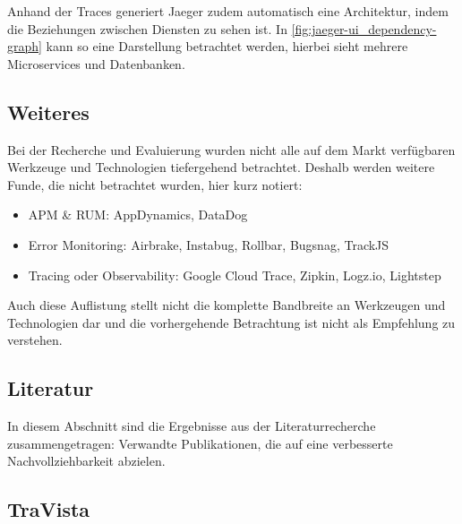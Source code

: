 Anhand der Traces generiert Jaeger zudem automatisch eine Architektur, indem die Beziehungen zwischen Diensten zu sehen ist. In \autoref{fig:jaeger-ui_dependency-graph} kann so eine Darstellung betrachtet werden, hierbei sieht mehrere Microservices und Datenbanken.

\subsection{Weiteres}
\label{sec:weitere-werkzeuge}

Bei der Recherche und Evaluierung wurden nicht alle auf dem Markt verfügbaren Werkzeuge und Technologien tiefergehend betrachtet. Deshalb werden weitere Funde, die nicht betrachtet wurden, hier kurz notiert:

\begin{itemize}
	\item APM \& RUM: AppDynamics, DataDog
	\item Error Monitoring: Airbrake, Instabug, Rollbar, Bugsnag, TrackJS
	\item Tracing oder Observability: Google Cloud Trace, Zipkin, Logz.io, Lightstep
\end{itemize}

Auch diese Auflistung stellt nicht die komplette Bandbreite an Werkzeugen und Technologien dar und die vorhergehende Betrachtung ist nicht als Empfehlung zu verstehen.

\subsection{Literatur}

In diesem Abschnitt sind die Ergebnisse aus der Literaturrecherche zusammengetragen: Verwandte Publikationen, die auf eine verbesserte Nachvollziehbarkeit abzielen.


\subsection{TraVista}

